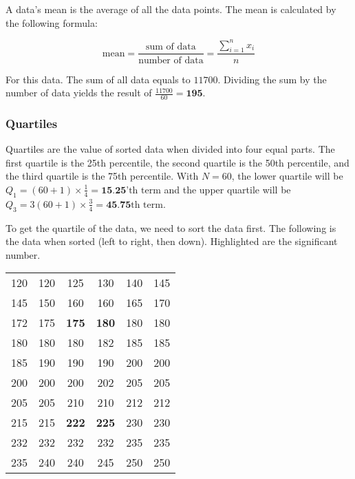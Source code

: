 \documentclass[
  11pt, %
]{assignment}
\begin{document}
A data's mean is the average of all the data points. The mean is calculated by the following formula:

\begin{equation}
  \text{mean} = \frac{\text{sum of data}}{\text{number of data}} = \frac{\sum_{i=1}^{n} x_i}{n}
\end{equation}

For this data. The sum of all data equals to \(11700\). Dividing the sum by the number of data yields the result of \(\frac{11700}{60} = \textbf{195}\).

\subsubsection*{Quartiles}

Quartiles are the value of sorted data when divided into four equal parts. The first quartile is the 25th percentile, the second quartile is the 50th percentile, and the third quartile is the 75th percentile. With \(N = 60\), the lower quartile will be \( Q_1 = (60 + 1) \times \frac{1}{4} = \textbf{15.25}\text{'th term} \) and the upper quartile will be \( Q_3 = 3(60 + 1) \times \frac{3}{4} = \textbf{45.75}\text{th term} \).

\medskip

To get the quartile of the data, we need to sort the data first. The following is the data when sorted (left to right, then down). Highlighted are the significant number.

\begin{center}
  \begin{tabular}{| c c c c c c |}
    \toprule
    120 & 120 & 125          & 130          & 140 & 145 \\
    145 & 150 & 160          & 160          & 165 & 170 \\
    172 & 175 & \textbf{175} & \textbf{180} & 180 & 180 \\
    180 & 180 & 180          & 182          & 185 & 185 \\
    185 & 190 & 190          & 190          & 200 & 200 \\
    200 & 200 & 200          & 202          & 205 & 205 \\
    205 & 205 & 210          & 210          & 212 & 212 \\
    215 & 215 & \textbf{222} & \textbf{225} & 230 & 230 \\
    232 & 232 & 232          & 232          & 235 & 235 \\
    235 & 240 & 240          & 245          & 250 & 250 \\
    \bottomrule
  \end{tabular}
\end{center}
\end{document}
